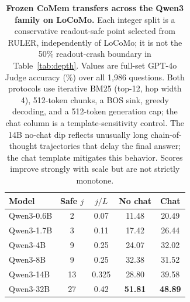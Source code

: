 \begin{table}[t]
\centering
\small
\setlength{\tabcolsep}{5pt}
\begin{tabular}{@{}lcccc@{}}
\toprule
\textbf{Model} & \textbf{Safe $j$} & \textbf{$j/L$} & \textbf{No chat} & \textbf{Chat} \\
\midrule
Qwen3-0.6B & 2  & 0.07 & 11.48 & 20.49 \\
Qwen3-1.7B & 3  & 0.11 & 17.42 & 26.44 \\
Qwen3-4B   & 9  & 0.25 & 24.07 & 32.02 \\
Qwen3-8B   & 9  & 0.25 & 32.38 & 31.52 \\
Qwen3-14B  & 13 & 0.325 & 28.80 & 39.58 \\
Qwen3-32B  & 27 & 0.42 & \textbf{51.81} & \textbf{48.89} \\
\bottomrule
\end{tabular}
\caption{\textbf{Frozen CoMem transfers across the Qwen3 family on LoCoMo.}
Each integer split is a conservative readout-safe point selected from RULER,
independently of LoCoMo; it is not the 50\% readout-crash boundary in
Table~\ref{tab:depth}. Values are full-set GPT-4o Judge accuracy (\%) over all
1,986 questions. Both protocols use iterative BM25 (top-12, hop width 4),
512-token chunks, a BOS sink, greedy decoding, and a 512-token generation cap;
the chat column is a template-sensitivity control. The 14B no-chat dip reflects
unusually long chain-of-thought trajectories that delay the final answer; the
chat template mitigates this behavior. Scores improve strongly with scale but
are not strictly monotone.}
\label{tab:locomo-scale}
\end{table}
